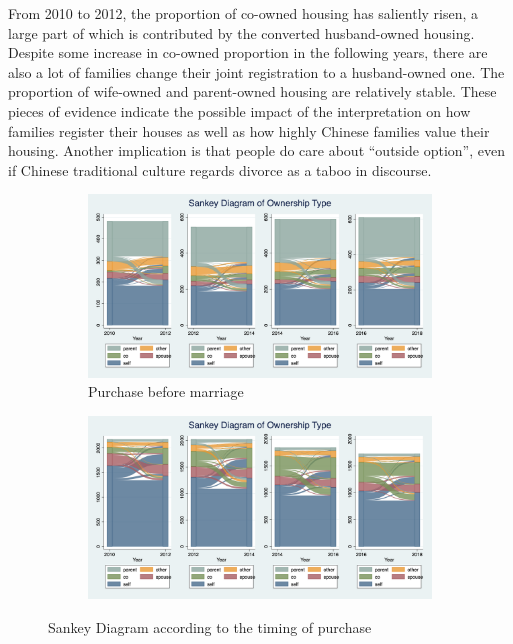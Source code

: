\documentclass[11pt]{article}
\begin{document}
From 2010 to 2012, the proportion of co-owned housing has saliently risen, a large part of which is contributed by the converted husband-owned housing. Despite some increase in co-owned proportion in the following years, there are also a lot of families change their joint registration to a husband-owned one. The proportion of wife-owned and parent-owned housing are relatively stable. These pieces of evidence indicate the possible impact of the interpretation on how families register their houses as well as how highly Chinese families value their housing. Another implication is that people do care about ``outside option'', even if Chinese traditional culture regards divorce as a taboo in discourse.

\begin{figure}
    \centering
    \begin{subfigure}[b]{0.45\textwidth}
        \centering
        \includegraphics[width=\textwidth]{graphs_new/pbeforem_sankeyall_nonpanel.png}
        \caption{Purchase before marriage}
        \label{fig:pbeforem}
        
    \end{subfigure}
    \hfill
    \begin{subfigure}[b]{0.45\textwidth}
        \centering
        \includegraphics[width=\textwidth]{graphs_new/pafterm_sankeyall_nonpanel.png}
        \label{fig:pafterm}
        
    \end{subfigure}
    \caption{Sankey Diagram according to the timing of purchase}
    \label{fig:timing}
\end{figure}
\end{document}
